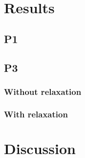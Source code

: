 \newpage
\chapter{Results}

\section{P1}

\section{P3}

\subsection{Without relaxation}

\subsection{With relaxation}

\chapter{Discussion}
